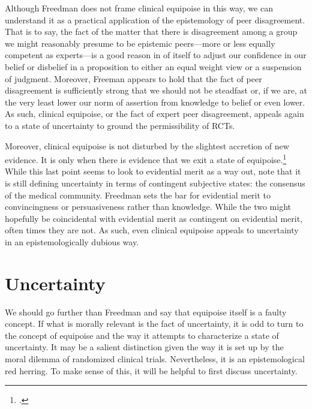 \documentclass[letterpaper,notitlepage,12pt]{article}
\begin{document}
Although Freedman does not frame clinical equipoise in this way, we can
understand it as a practical application of the epistemology of peer
disagreement.
That is to say, the fact of the matter that there is disagreement among a group
we might reasonably presume to be epistemic peers---more or less equally
competent as experts---is a good reason in of itself to adjust our confidence in
our belief or disbelief in a proposition to either an equal weight view or a
suspension of judgment.
Moreover, Freeman appears to hold that the fact of peer disagreement is
sufficiently strong that we should not be steadfast or, if we are, at the very
least lower our norm of assertion from knowledge to belief or even lower.
As such, clinical equipoise, or the fact of expert peer disagreement, appeals
again to a state of uncertainty to ground the permissibility of RCTs.

Moreover, clinical equipoise is not disturbed by the slightest accretion of new
evidence.
It is only when there is evidence  that we exit a state of equipoise.\footcite[p.
430]{freedman_equipoise_1987}
While this last point seems to look to evidential merit as a way out, note that
it is still defining uncertainty in terms of contingent subjective states: the
consensus of the medical community.
Freedman sets the bar for evidential merit to convincingness or persuasiveness
rather than knowledge.
While the two might hopefully be coincidental with evidential merit as
contingent on evidential merit, often times they are not.
As such, even clinical equipoise appeals to uncertainty in an epistemologically
dubious way.

\section{Uncertainty}

We should go further than Freedman and say that equipoise itself is a faulty 
concept.
If what is morally relevant is the fact of uncertainty, it is odd
to turn to the concept of equipoise and the way it attempts to characterize a
state of uncertainty.
It may be a salient distinction given the way it is set up by the moral dilemma
of randomized clinical trials.
Nevertheless, it is an epistemological red herring.
To make sense of this, it will be helpful to first discuss uncertainty.
\end{document}
